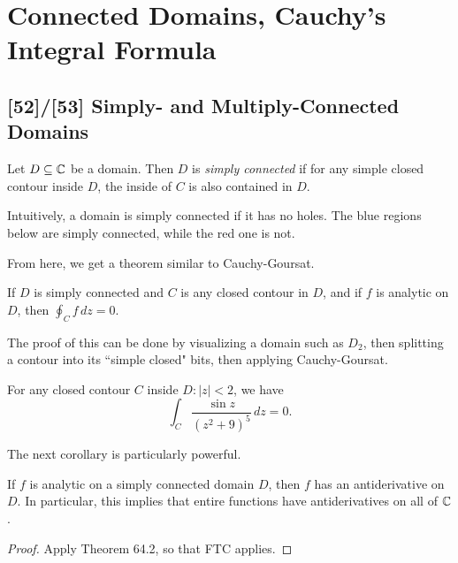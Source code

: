 \documentclass{article}
\begin{document}
\section{Connected Domains, Cauchy's Integral Formula}
\subsection*{[52]/[53] Simply- and Multiply-Connected Domains}
\begin{definition}
Let $D\subseteq \mathbb C$ be a domain. Then $D$ is \textit{simply connected} if for any simple closed contour inside $D$, the inside of $C$ is also contained in $D$.
\end{definition}
Intuitively, a domain is simply connected if it has no holes. The blue regions below are simply connected, while the red one is not.
\begin{center}
\end{center}
From here, we get a theorem similar to Cauchy-Goursat.
\begin{theorem}
If $D$ is simply connected and $C$ is any closed contour in $D$, and if $f$ is analytic on $D$, then $\oint_C f\, dz = 0$.
\end{theorem}

The proof of this can be done by visualizing a domain such as $D_2$, then splitting a contour into its ``simple closed" bits, then applying Cauchy-Goursat. \newpage

\begin{example}
For any closed contour $C$ inside $D: |z|<2$, we have
$$\int_C \frac{\sin z}{(z^2+9)^5} \, dz = 0.$$
\end{example}

The next corollary is particularly powerful.
\begin{corollary}
If $f$ is analytic on a simply connected domain $D$, then $f$ has an antiderivative on $D$. In particular, this implies that entire functions have antiderivatives on all of $\mathbb C$.
\end{corollary}
\begin{proof}
Apply Theorem 64.2, so that FTC applies.
\end{proof}
\end{document}
